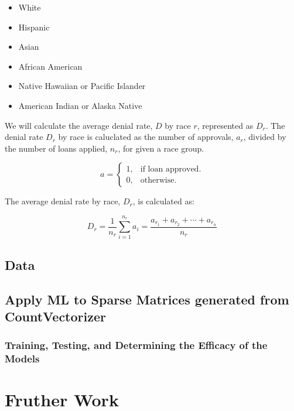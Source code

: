 \documentclass[11pt]{article}
\begin{document}
{\begin{itemize}
  \item White
  \item Hispanic
  \item Asian
  \item African American
  \item Native Hawaiian or Pacific Islander
  \item American Indian or Alaska Native
\end{itemize}

We will calculate the average denial rate, $D$ by race $r$, represented as $D_r$.  The denial rate $D_r$ by race is caluclated as the number of approvals, $a_r$, divided by the number of loans applied, $n_r$, for given a race group.


\begin{equation}
  a=\begin{cases}
    1, & \text{if loan approved}.\\
    0, & \text{otherwise}.
  \end{cases}
\end{equation}

\noindent The average denial rate by race, $D_r$, is calculated as: 

$$D_r={\frac {1}{n_r}}\sum _{i=1}^{n_r}a_{i}={\frac {a_{r_1}+a_{r_2}+\cdots +a_{r_n}}{n_r}}$$




\subsection{Data}





\subsection{Apply ML to Sparse Matrices generated from CountVectorizer}



\subsubsection{Training, Testing, and Determining the Efficacy of the Models}



\section{Fruther Work}

}
\end{document}
